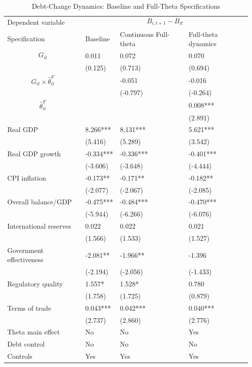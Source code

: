 \begin{table}[H]\centering
\begin{threeparttable}
\caption{Debt-Change Dynamics: Baseline and Full-Theta Specifications}
\label{tab:debt_change_combined_fulltheta}
\scriptsize
\begin{tabularx}{\textwidth}{lYYY}
\toprule
Dependent variable &  \\
\cmidrule(lr){2-4}
Specification & Baseline & Continuous Full-theta & Full-theta dynamics \\
\midrule
$$G_{it}$$ & 0.011 & 0.072 & 0.070 \\
 & (0.125) & (0.713) & (0.694) \\
$$G_{it}\times\widehat{\theta}^{F}_{it}$$ &  & -0.051 & -0.016 \\
 &  & (-0.797) & (-0.264) \\
$$\widehat{\theta}^{F}_{it}$$ &  &  & 0.008*** \\
 &  &  & (2.891) \\
Real GDP & 8.266*** & 8.131*** & 5.621*** \\
 & (5.416) & (5.289) & (3.542) \\
Real GDP growth & -0.334*** & -0.336*** & -0.401*** \\
 & (-3.606) & (-3.648) & (-4.444) \\
CPI inflation & -0.173** & -0.171** & -0.182** \\
 & (-2.077) & (-2.067) & (-2.085) \\
Overall balance/GDP & -0.475*** & -0.484*** & -0.470*** \\
 & (-5.944) & (-6.266) & (-6.076) \\
International reserves & 0.022 & 0.022 & 0.021 \\
 & (1.566) & (1.533) & (1.527) \\
Government effectiveness & -2.081** & -1.966** & -1.396 \\
 & (-2.194) & (-2.056) & (-1.433) \\
Regulatory quality & 1.557* & 1.528* & 0.780 \\
 & (1.758) & (1.725) & (0.879) \\
Terms of trade & 0.043*** & 0.042*** & 0.040*** \\
 & (2.737) & (2.860) & (2.776) \\
\midrule
Theta main effect & No & No & Yes \\
Debt control & No & No & No \\
Controls & Yes & Yes & Yes \\

\end{tabularx}
\end{threeparttable}
\end{table}
